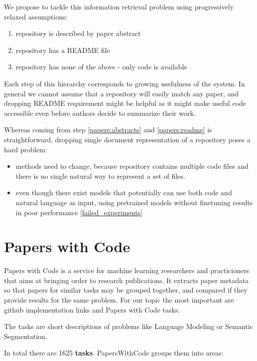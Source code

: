 \documentclass[11pt]{report}
\begin{document}
We propose to tackle this information retrieval problem using progressively
relaxed  
assumptions: 

\begin{enumerate}
\item repository \label{papers:abstracts} is described by paper abstract
\item repository \label{papers:readme} has a README file
\item repository \label{papers:code} has none of the above - only code is available 
\end{enumerate}

Each step of this hierarchy corresponds to growing usefulness of the system. In
general we cannot assume that a repository will easily match any paper, and
dropping README requirement might be helpful as it might make useful code
accessible even before authors decide to summarize their work.

Whereas coming from step \ref{papers:abstracts} and \ref{papers:readme} is
straightforward, dropping single document representation of a repository poses a
hard problem:

\begin{itemize}
\item methods need to change, because repository contains multiple code files
  and there is no single natural way to represent a set of files.
\item even though there exist models that potentially can use both code  and
  natural language as input, using pretrained models without finetuning results
  in poor performance \ref{failed_experiments} 
\end{itemize}

\section{Papers with Code}

Papers with Code is a service for machine learning researchers and practicioners that aims at bringing order to research publications. It extracts paper metadata so that papers for similar tasks may be grouped together, and compared if they provide results for the same problem. For our topic the most important are github implementation links and Papers with Code tasks.

The tasks are short descriptions of problems like Language Modeling or Semantic Segmentation.

In total there are 1625 \textbf{tasks}. PapersWithCode groups them into areas:
\end{document}
